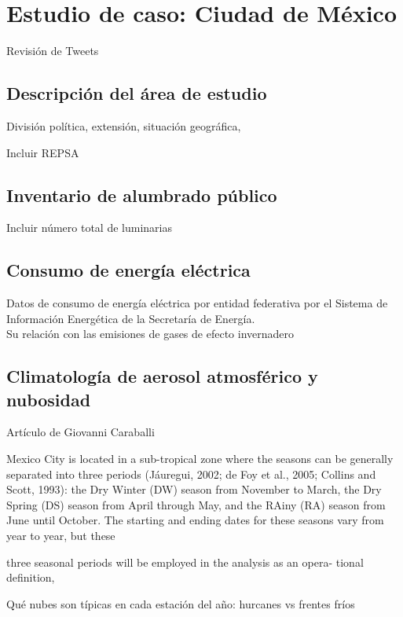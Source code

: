 \section{Estudio de caso: Ciudad de México}

Revisión de Tweets

\subsection{Descripción del área de estudio}

División política, extensión, situación geográfica, 

Incluir REPSA

\subsection{Inventario de alumbrado público}

Incluir número total de luminarias

\subsection{Consumo de energía eléctrica}

Datos de consumo de energía eléctrica por entidad federativa por el Sistema de Información Energética de la Secretaría de Energía.\\

Su relación con las emisiones de gases de efecto invernadero 

\subsection{Climatología de aerosol atmosférico y nubosidad}

Artículo de Giovanni Caraballi

Mexico City is located in a sub-tropical zone where the seasons can
be generally separated into three periods (Jáuregui, 2002; de Foy et al.,
2005; Collins and Scott, 1993): the Dry Winter (DW) season from
November to March, the Dry Spring (DS) season from April through
May, and the RAiny (RA) season from June until October. The starting
and ending dates for these seasons vary from year to year, but these

three seasonal periods will be employed in the analysis as an opera-
tional definition,

Qué nubes son típicas en cada estación del año: hurcanes vs frentes fríos

